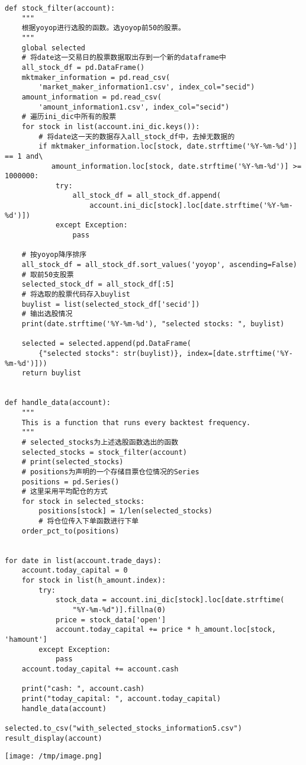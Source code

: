 \documentclass[11pt]{article}
\begin{document}
\begin{lstlisting}
def stock_filter(account):
    """
    根据yoyop进行选股的函数。选yoyop前50的股票。
    """
    global selected
    # 将date这一交易日的股票数据取出存到一个新的dataframe中
    all_stock_df = pd.DataFrame()
    mktmaker_information = pd.read_csv(
        'market_maker_information1.csv', index_col="secid")
    amount_information = pd.read_csv(
        'amount_information1.csv', index_col="secid")
    # 遍历ini_dic中所有的股票
    for stock in list(account.ini_dic.keys()):
        # 将date这一天的数据存入all_stock_df中，去掉无数据的
        if mktmaker_information.loc[stock, date.strftime('%Y-%m-%d')] == 1 and\
           amount_information.loc[stock, date.strftime('%Y-%m-%d')] >= 1000000:
            try:
                all_stock_df = all_stock_df.append(
                    account.ini_dic[stock].loc[date.strftime('%Y-%m-%d')])
            except Exception:
                pass

    # 按yoyop降序排序
    all_stock_df = all_stock_df.sort_values('yoyop', ascending=False)
    # 取前50支股票
    selected_stock_df = all_stock_df[:5]
    # 将选取的股票代码存入buylist
    buylist = list(selected_stock_df['secid'])
    # 输出选股情况
    print(date.strftime('%Y-%m-%d'), "selected stocks: ", buylist)

    selected = selected.append(pd.DataFrame(
        {"selected stocks": str(buylist)}, index=[date.strftime('%Y-%m-%d')]))
    return buylist


def handle_data(account):
    """
    This is a function that runs every backtest frequency.
    """
    # selected_stocks为上述选股函数选出的函数
    selected_stocks = stock_filter(account)
    # print(selected_stocks)
    # positions为声明的一个存储目票仓位情况的Series
    positions = pd.Series()
    # 这里采用平均配仓的方式
    for stock in selected_stocks:
        positions[stock] = 1/len(selected_stocks)
        # 将仓位传入下单函数进行下单
    order_pct_to(positions)


for date in list(account.trade_days):
    account.today_capital = 0
    for stock in list(h_amount.index):
        try:
            stock_data = account.ini_dic[stock].loc[date.strftime(
                "%Y-%m-%d")].fillna(0)
            price = stock_data['open']
            account.today_capital += price * h_amount.loc[stock, 'hamount']
        except Exception:
            pass
    account.today_capital += account.cash

    print("cash: ", account.cash)
    print("today_capital: ", account.today_capital)
    handle_data(account)

selected.to_csv("with_selected_stocks_information5.csv")
result_display(account)
\end{lstlisting}

\begin{center}
\texttt{[image: /tmp/image.png]}
\end{center}
\end{document}
